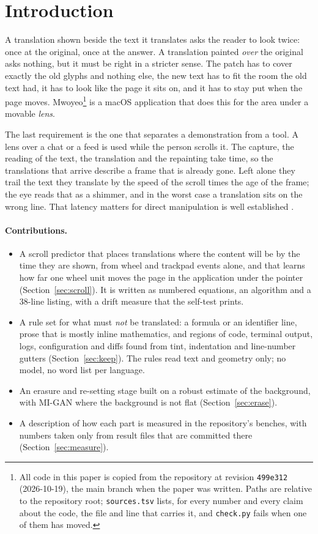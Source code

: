 \section{Introduction}\label{sec:intro}

A translation shown beside the text it translates asks the reader to look twice: once at the original, once at the
answer. A translation painted \emph{over} the original asks nothing, but it must be right in a stricter sense. The patch has to
cover exactly the old glyphs and nothing else, the new text has to fit the room the old text had, it has to look like the
page it sits on, and it has to stay put when the page moves. Mwoyeo\footnote{All code in this paper is copied from the
repository at revision \texttt{499e312} (2026-10-19), the main branch when the paper was written. Paths are relative to the
repository root; \texttt{sources.tsv} lists, for every number and every claim about the code, the file and line that carries
it, and \texttt{check.py} fails when one of them has moved.} is a macOS application that does this for the area under a
movable \emph{lens}.

The last requirement is the one that separates a demonstration from a tool. A lens over a chat or a feed is used while the
person scrolls it. The capture, the reading of the text, the translation and the repainting take time, so the translations
that arrive describe a frame that is already gone. Left alone they trail the text they translate by the speed of the scroll
times the age of the frame; the eye reads that as a shimmer, and in the worst case a translation sits on the wrong line.
That latency matters for direct manipulation is well established \citep{latency}.

\paragraph{Contributions.}
\begin{itemize}
\item A scroll predictor that places translations where the content will be by the time they are shown, from wheel and
  trackpad events alone, and that learns how far one wheel unit moves the page in the application under the pointer
  (Section~\ref{sec:scroll}). It is written as numbered equations, an algorithm and a 38-line listing, with a drift
  measure that the self-test prints.
\item A rule set for what must \emph{not} be translated: a formula or an identifier line, prose that is mostly inline mathematics,
  and regions of code, terminal output, logs, configuration and diffs found from tint, indentation and line-number gutters
  (Section~\ref{sec:keep}). The rules read text and geometry only; no model, no word list per language.
\item An erasure and re-setting stage built on a robust estimate of the background, with MI-GAN \citep{migan} where the
  background is not flat (Section~\ref{sec:erase}).
\item A description of how each part is measured in the repository's benches, with numbers taken only from result files
  that are committed there (Section~\ref{sec:measure}).
\end{itemize}

